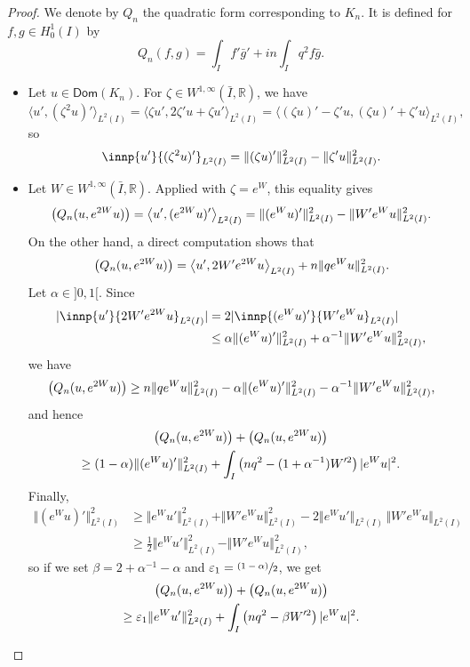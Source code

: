\documentclass[10pt]{amsart}
\newcommand{\psfrac}[2]{\sfrac{(#1)}{#2}}
\theoremstyle{plain}
\theoremstyle{definition}
\newcommand{\abs}[1]{\vert #1\vert}
\newcommand{\nr}[1]{\Vert #1\Vert}
\newcommand{\binnp}[2]{\bigl\langle #1 , #2 \bigr\rangle}
\newcommand{\inv}{^{-1}}
\newcommand{\1}{\mathds 1}
\let\Re\relax
\DeclareMathOperator{\Re}{\mathsf{Re}\mkern2mu}
\let\Im\relax
\DeclareMathOperator{\Im}{\mathsf{Im}\mkern2mu}
\newcommand{\Dom}{\mathsf{Dom}}
\newcommand{\R}{\mathbb{R}}
\let\a\alpha
\let\e\varepsilon
\let\z\zeta
\begin{document}
\begin{proof}
We denote by $Q_n$ the quadratic form corresponding to $K_n$. It is defined for $f,g \in H_0^1(I)$ by
\[
Q_n(f,g) = \int_I f' \bar g' + i n \int_I q^2 f \bar g.
\]

\begin{itemize}
\item
Let $u \in \Dom(K_n)$. For $\zeta \in W^{1,\infty}(\bar I,\R)$, we have
\[
\binnp{u'}{(\zeta^2 u)'}_{L^2(I)} = \binnp{\z u'}{2\z'u + \z u'}_{L^2(I)} = \binnp{(\zeta u)' - \zeta' u}{(\zeta u)' + \zeta' u}_{L^2(I)},
\]
so
\begin{equation*}
\Re \innp{u'}{(\zeta^2 u)'}_{L^2(I)} = \nr{(\zeta u)'}^2_{L^2(I)} - \nr{\zeta' u}^2_{L^2(I)}.
\end{equation*}

\item
Let $W \in W^{1,\infty}(\bar I,\R)$. Applied with $\zeta = e^{W}$, this equality gives
\begin{equation*}
\Re \bigl(Q_n (u,e^{2W}u) \bigr) = \Re \binnp{u'}{(e^{2W} u)'}_{L^2(I)} = \nr{(e^{W}u)'}^2_{L^2(I)} - \nr{W' e^W u}^2_{L^2(I)}.
\end{equation*}
On the other hand, a direct computation shows that
\[
\Im \bigl(Q_n (u,e^{2W}u) \bigr) = \Im \binnp{u'}{2W' e^{2W} u}_{L^2(I)} + n \nr{q e^W u}^2_{L^2(I)}.
\]
Let $\a \in{}]0,1[$. Since
\begin{align*}
\abs{\Im \innp{u'}{2W' e^{2W} u}_{L^2(I)}}
& = 2 \abs{\Im \innp{(e^W u)'}{W' e^{W} u}_{L^2(I)}} \\
& \leq \a \nr{(e^W u)'}^2_{L^2(I)} + \a\inv\nr{W' e^W u}^2_{L^2(I)},
\end{align*}
we have
\[
\Im \bigl(Q_n (u,e^{2W}u) \bigr) \geq n \nr{q e^W u}^2_{L^2(I)} - \a \nr{(e^W u)'}^2_{L^2(I)} - \a\inv\nr{W' e^W u}^2_{L^2(I)},
\]
and hence
\begin{multline*}
\Re \bigl(Q_n (u,e^{2W}u) \bigr) + \Im \bigl(Q_n (u,e^{2W}u) \bigr)\\
\geq (1-\a) \nr{(e^{W}u)'}^2_{L^2(I)} + \int_{I} \left(nq^2 - (1+\a\inv) W'^2 \right) |e^W u|^2 .
\end{multline*}
Finally,
\begin{align*}
\nr{(e^{W}u)'}^2_{L^2(I)}
& \geq \nr{e^W u'}^2_{L^2(I)} + \nr{W' e^W u}^2_{L^2(I)} - 2\nr{e^W u'}_{L^2(I)}\,\nr{W' e^W u}_{L^2(I)}\\
& \geq \frac 12 \nr{e^W u'}^2_{L^2(I)} - \nr{W' e^W u}^2_{L^2(I)},
\end{align*}
so if we set $\beta = 2 + \a\inv - \a$ and $\e_1 = \psfrac {1-\a} 2$, we get
\begin{multline} \label{minor-Re-Im-Q}
\Re \bigl(Q_n (u,e^{2W}u) \bigr) + \Im \bigl(Q_n (u,e^{2W}u) \bigr)\\
\geq \e_1 \nr{e^{W}u'}^2_{L^2(I)} + \int_{I} \left(nq^2 - \beta W'^2 \right) |e^W u|^2 .
\end{multline}


\end{itemize}
\end{proof}
\end{document}
